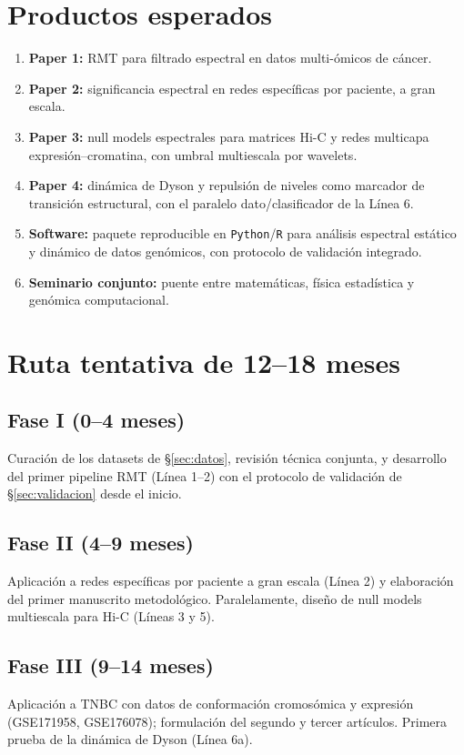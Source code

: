 \documentclass[11pt]{article}
\begin{document}
\section{Productos esperados}
\begin{enumerate}[label=\arabic*.]
    \item \textbf{Paper 1:} RMT para filtrado espectral en datos multi-ómicos de cáncer.
    \item \textbf{Paper 2:} significancia espectral en redes específicas por paciente, a gran escala.
    \item \textbf{Paper 3:} null models espectrales para matrices Hi-C y redes multicapa expresión--cromatina, con umbral multiescala por wavelets.
    \item \textbf{Paper 4:} dinámica de Dyson y repulsión de niveles como marcador de transición estructural, con el paralelo dato/clasificador de la Línea 6.
    \item \textbf{Software:} paquete reproducible en \texttt{Python}/\texttt{R} para análisis espectral estático y dinámico de datos genómicos, con protocolo de validación integrado.
    \item \textbf{Seminario conjunto:} puente entre matemáticas, física estadística y genómica computacional.
\end{enumerate}

\section{Ruta tentativa de 12--18 meses}
\subsection*{Fase I (0--4 meses)}
Curación de los datasets de \S\ref{sec:datos}, revisión técnica conjunta, y desarrollo del primer pipeline RMT (Línea 1--2) con el protocolo de validación de \S\ref{sec:validacion} desde el inicio.

\subsection*{Fase II (4--9 meses)}
Aplicación a redes específicas por paciente a gran escala (Línea 2) y elaboración del primer manuscrito metodológico. Paralelamente, diseño de null models multiescala para Hi-C (Líneas 3 y 5).

\subsection*{Fase III (9--14 meses)}
Aplicación a TNBC con datos de conformación cromosómica y expresión (GSE171958, GSE176078); formulación del segundo y tercer artículos. Primera prueba de la dinámica de Dyson (Línea 6a).
\end{document}
